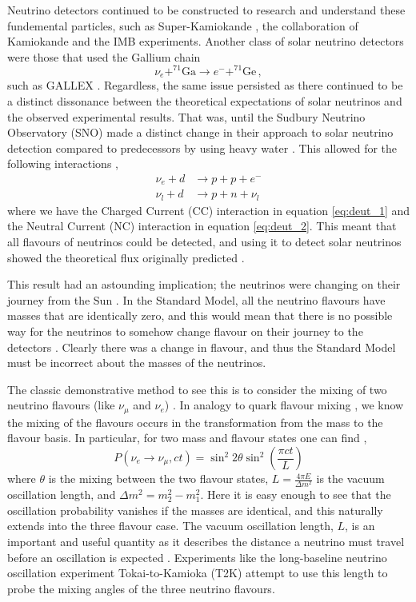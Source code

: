 Neutrino detectors continued to be constructed to research and understand these fundemental particles, such as Super-Kamiokande \cite{superk}, the collaboration of Kamiokande \cite{kam} and the IMB \cite{imb} experiments. Another class of solar neutrino detectors were those that used the Gallium chain
\begin{equation}\label{eq:gal}
  \nu_{e} + ^{71}\text{Ga} \to e^{-} + ^{71}\text{Ge}\, ,
\end{equation}
such as GALLEX \cite{gallex}. Regardless, the same issue persisted as there continued to be a distinct dissonance between the theoretical expectations of solar neutrinos and the observed experimental results. That was, until the Sudbury Neutrino Observatory (SNO) made a distinct change in their approach to solar neutrino detection compared to predecessors by using heavy water \cite{sno}. This allowed for the following interactions \cite{sno},
\begin{align}
  \nu_{e} + d & \to p + p + e^{-} \label{eq:deut_1} \\
  \nu_{l} + d & \to p + n + \nu_{l} \label{eq:deut_2}
\end{align}
where we have the Charged Current (CC) interaction in equation \ref{eq:deut_1} and the Neutral Current (NC) interaction in equation \ref{eq:deut_2}. This meant that all flavours of neutrinos could be detected, and using it to detect solar neutrinos showed the theoretical flux originally predicted \cite{sno}.

This result had an astounding implication; the neutrinos were changing on their journey from the Sun \cite{sno}. In the Standard Model, all the neutrino flavours have masses that are identically zero, and this would mean that there is no possible way for the neutrinos to somehow change flavour on their journey to the detectors \cite{solar_nu}. Clearly there was a change in flavour, and thus the Standard Model must be incorrect about the masses of the neutrinos.

The classic demonstrative method to see this is to consider the mixing of two neutrino flavours (like $\nu_{\mu}$ and $\nu_{e}$) \cite{solar_nu}. In analogy to quark flavour mixing \cite{pdg_ckm}, we know the mixing of the flavours occurs in the transformation from the mass to the flavour basis. In particular, for two mass and flavour states one can find \cite{solar_nu},
\begin{equation}
  P(\nu_{e} \to \nu_{\mu}, ct) = \sin^{2}2\theta\sin^{2}\left(\frac{\pi ct}{L}\right)
\end{equation}
where $\theta$ is the mixing between the two flavour states, $L = \frac{4\pi E}{\Delta m^{2}}$ is the vacuum oscillation length, and $\Delta m^{2} = m_{2}^{2} - m_{1}^{2}$. Here it is easy enough to see that the oscillation probability vanishes if the masses are identical, and this naturally extends into the three flavour case. The vacuum oscillation length, $L$, is an important and useful quantity as it describes the distance a neutrino must travel before an oscillation is expected \cite{solar_nu}. Experiments like the long-baseline neutrino oscillation experiment Tokai-to-Kamioka (T2K) attempt to use this length to probe the mixing angles of the three neutrino flavours. 

